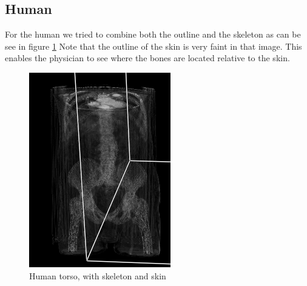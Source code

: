 \documentclass[a4paper,twoside,11pt]{article}
\begin{document}
 \subsection{Human}
 For the human we tried to combine both the outline and the skeleton as can be see in figure \ref{bodyOp} Note that the outline of the skin is very faint in that image. This enables the physician to see where the bones are located relative to the skin.
 \begin{figure}[H]
 \centering
 \includegraphics[scale=0.9]{images/bodyOp2}
 \caption{Human torso, with skeleton and skin}
 \label{bodyOp}
 \end{figure}
 
\end{document}

